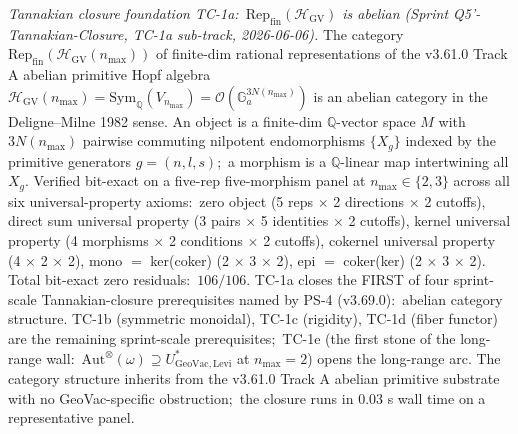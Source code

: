 \documentclass[11pt,a4paper]{article}
\theoremstyle{plain}
\theoremstyle{definition}
\begin{document}
\emph{Tannakian closure foundation TC-1a:\
$\mathrm{Rep}_{\mathrm{fin}}(\mathcal{H}_{\mathrm{GV}})$ is abelian
(Sprint Q5'-Tannakian-Closure, TC-1a sub-track, 2026-06-06).}  The category
$\mathrm{Rep}_{\mathrm{fin}}(\mathcal{H}_{\mathrm{GV}}(n_{\max}))$
of finite-dim rational representations of the v3.61.0 Track A
abelian primitive Hopf algebra
$\mathcal{H}_{\mathrm{GV}}(n_{\max}) = \mathrm{Sym}_\mathbb{Q}(V_{n_{\max}})
= \mathcal{O}(\mathbb{G}_a^{3 N(n_{\max})})$ is an abelian category
in the Deligne--Milne 1982 sense.  An object is a finite-dim
$\mathbb{Q}$-vector space $M$ with $3 N(n_{\max})$ pairwise commuting
nilpotent endomorphisms $\{X_g\}$ indexed by the primitive generators
$g = (n, l, s)$;\ a morphism is a $\mathbb{Q}$-linear map intertwining
all $X_g$.  Verified bit-exact on a five-rep five-morphism panel at
$n_{\max} \in \{2, 3\}$ across all six universal-property axioms:\
zero object (5 reps $\times$ 2 directions $\times$ 2 cutoffs),
direct sum universal property (3 pairs $\times$ 5 identities $\times$
2 cutoffs), kernel universal property
(4 morphisms $\times$ 2 conditions $\times$ 2 cutoffs), cokernel
universal property (4 $\times$ 2 $\times$ 2), mono $=$ ker(coker)
(2 $\times$ 3 $\times$ 2), epi $=$ coker(ker) (2 $\times$ 3 $\times$ 2).
Total bit-exact zero residuals:\ $106 / 106$.  TC-1a closes the
FIRST of four sprint-scale Tannakian-closure prerequisites named by
PS-4 (v3.69.0):\ abelian category structure. TC-1b (symmetric
monoidal), TC-1c (rigidity), TC-1d (fiber functor) are the remaining
sprint-scale prerequisites;\ TC-1e (the first stone of the long-range
wall:\ $\mathrm{Aut}^\otimes(\omega) \supseteq
U^\ast_{\mathrm{GeoVac}, \mathrm{Levi}}$ at $n_{\max} = 2$) opens
the long-range arc.  The category structure inherits from the
v3.61.0 Track A abelian primitive substrate with no GeoVac-specific
obstruction;\ the closure runs in 0.03 s wall time on a representative
panel.
\end{document}
